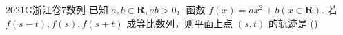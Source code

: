 
\begin{problem}{2021}{G}{浙江卷}{7}{数列}
已知 $a, b \in \mathbf{R}, ab>0$，函数 $f(x)=ax^2+b(x\in \mathbf{R})$. 若 $f(s-t), f(s), f(s+t)$ 成等比数列，则平面上点 $(s,t)$ 的轨迹是
(\hspace{1cm})
\begin{choices}
\end{choices}
\end{problem}